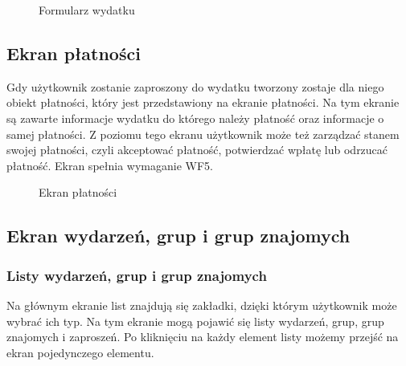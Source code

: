 \begin{figure}[h!]%
    \centering
    \qquad
    \qquad
    \caption{Formularz wydatku}%
\end{figure}

\clearpage
\subsection{Ekran płatności}
Gdy użytkownik zostanie zaproszony do wydatku tworzony zostaje dla niego obiekt płatności, który jest przedstawiony na ekranie płatności. Na tym ekranie są zawarte informacje wydatku do którego należy płatność oraz informacje o samej płatności. Z poziomu tego ekranu użytkownik może też zarządzać stanem swojej płatności, czyli akceptować płatność, potwierdzać wpłatę lub odrzucać płatność. Ekran spełnia wymaganie WF5.

\begin{figure}[h!]%
    \centering
    \qquad
    \qquad
    \qquad
    \caption{Ekran płatności}%
\end{figure}

\clearpage
\subsection{Ekran wydarzeń, grup i grup znajomych}
\subsubsection{Listy wydarzeń, grup i grup znajomych}
Na głównym ekranie list znajdują się zakładki, dzięki którym użytkownik może wybrać ich typ. Na tym ekranie mogą pojawić się listy wydarzeń, grup, grup znajomych i zaproszeń. Po kliknięciu na każdy element listy możemy przejść na ekran pojedynczego elementu.

